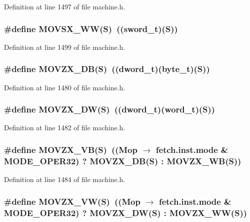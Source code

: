 Definition at line 1497 of file machine.h.
\subsubsection[{MOVSX\_\-WW}]{\setlength{\rightskip}{0pt plus 5cm}\#define MOVSX\_\-WW(S)~(({\bf sword\_\-t})(S))}\label{machine_8h_255fed00cb55f94fa1c67d4a3693d055}




Definition at line 1499 of file machine.h.
\subsubsection[{MOVZX\_\-DB}]{\setlength{\rightskip}{0pt plus 5cm}\#define MOVZX\_\-DB(S)~(({\bf dword\_\-t})({\bf byte\_\-t})(S))}\label{machine_8h_5274aafb10d875c1c69512181f2692ee}




Definition at line 1480 of file machine.h.
\subsubsection[{MOVZX\_\-DW}]{\setlength{\rightskip}{0pt plus 5cm}\#define MOVZX\_\-DW(S)~(({\bf dword\_\-t})({\bf word\_\-t})(S))}\label{machine_8h_0064722dd9c5d6a832a7229f49096770}




Definition at line 1482 of file machine.h.
\subsubsection[{MOVZX\_\-VB}]{\setlength{\rightskip}{0pt plus 5cm}\#define MOVZX\_\-VB(S)~((Mop $\rightarrow$ fetch.inst.mode \& MODE\_\-OPER32) ? MOVZX\_\-DB(S) : MOVZX\_\-WB(S))}\label{machine_8h_0eabba78c7a2ffbbed26656971d4b7fa}




Definition at line 1484 of file machine.h.
\subsubsection[{MOVZX\_\-VW}]{\setlength{\rightskip}{0pt plus 5cm}\#define MOVZX\_\-VW(S)~((Mop $\rightarrow$ fetch.inst.mode \& MODE\_\-OPER32) ? MOVZX\_\-DW(S) : MOVZX\_\-WW(S))}\label{machine_8h_5d917f73ba1758c54d4d99e31e92ca40}




